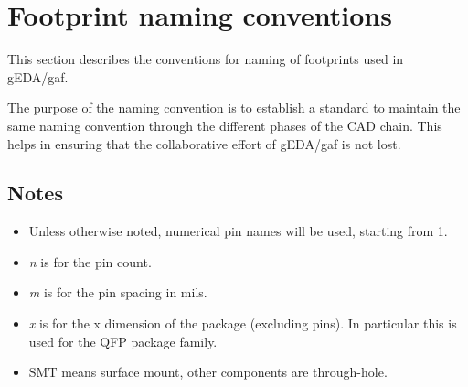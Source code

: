 \documentclass{article}
\begin{document}
\section{Footprint naming conventions}

This section describes the conventions for naming of footprints used in
gEDA/gaf. 

The purpose of the naming convention is to establish a standard to
maintain the same naming convention through the different phases of the 
CAD chain. This helps in ensuring that the collaborative effort of gEDA/gaf 
is not lost.

\subsection{Notes}
\begin{itemize}
\item  Unless otherwise noted, numerical pin names will be used,
       starting from 1.
\item  {\it n} is for the pin count.
\item  {\it m} is for the pin spacing in mils.
\item  {\it x} is for the x dimension of the package (excluding
       pins).  In particular this is used for the QFP package family.

\item  SMT means surface mount, other components are through-hole.
\end{itemize}
\end{document}
